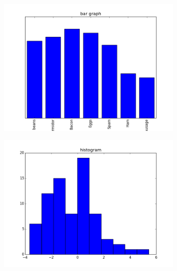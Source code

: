\begin{figure}
\centering
\begin{subfigure}{.3\textwidth}
\centering
\includegraphics[width=\textwidth]{bar_graph.png}
\end{subfigure}
\begin{subfigure}{.3\textwidth}
\centering
\includegraphics[width=\textwidth]{histogram.png}
\end{subfigure}
\begin{subfigure}{.3\textwidth}
\centering

\end{subfigure}
\end{figure}
